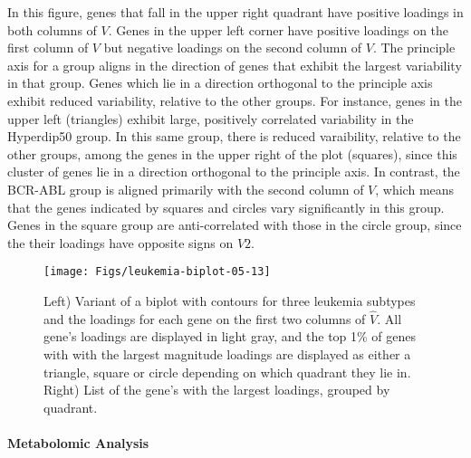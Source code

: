 \documentclass{article}
\begin{document}
In this figure, genes that fall in the upper right quadrant have
positive loadings in both columns of $V$. Genes in the upper left
corner have positive loadings on the first column of $V$ but negative
loadings on the second column of $V$.  The principle axis for a group
aligns in the direction of genes that exhibit the largest variability
in that group.  Genes which lie in a direction orthogonal to the
principle axis exhibit reduced variability, relative to the other
groups. For instance, genes in the upper left (triangles) exhibit
large, positively correlated variability in the Hyperdip50 group.  In
this same group, there is reduced varaibility, relative to the other
groups, among the genes in the upper right of the plot (squares),
since this cluster of genes lie in a direction orthogonal to the
principle axis.  In contrast, the BCR-ABL group is aligned primarily
with the second column of $V$, which means that the genes indicated by
squares and circles vary significantly in this group.  Genes in the
square group are anti-correlated with those in the circle group, since
the their loadings have opposite signs on $V2$.


  \begin{figure}[!ht]
    \centering
    \texttt{[image: Figs/leukemia-biplot-05-13]}
    \qquad
\raisebox{1.25\height}{
\footnotesize

}
\caption{Left) Variant of a biplot with contours for three leukemia
  subtypes and the loadings for each gene on the first two columns of
  $\hat{V}$.  All gene's loadings are displayed in light gray, and the
  top 1\% of genes with with the largest magnitude loadings are
  displayed as either a triangle, square or circle depending on which
  quadrant they lie in.  Right) List of the gene's with the largest
  loadings, grouped by quadrant. }
\label{fig:leukemiaBiplot}
  \end{figure}

\paragraph{Metabolomic Analysis}
\end{document}
